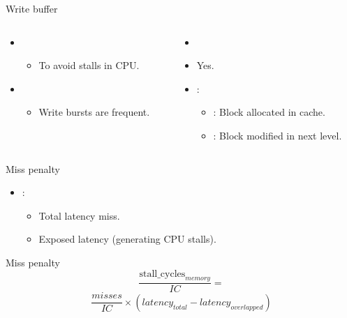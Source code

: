 \begin{frame}[t]{Write buffer}
\makebox[\textwidth][c]{

}

\begin{columns}[T]

\begin{column}{.5\textwidth}
\begin{itemize}
  \item {}
    \begin{itemize}
      \item To avoid stalls in CPU.
    \end{itemize}
  \item {}
    \begin{itemize}
      \item Write bursts are frequent.
    \end{itemize}
\end{itemize}
\end{column}

\begin{column}{.5\textwidth}
\begin{itemize}
  \item {}
    \item Yes.
    \item {}:
      \begin{itemize}
        \item {}: Block allocated in cache.
        \item {}: Block modified in next level.
      \end{itemize}
\end{itemize}
\end{column}

\end{columns}
\end{frame}

\begin{frame}[t]{Miss penalty}
\begin{itemize}
  \item {}:
    \begin{itemize}
      \item Total latency miss.
      \item Exposed latency (generating CPU stalls).
    \end{itemize}
\end{itemize}

\begin{block}{Miss penalty}
\[
\frac{\text{stall\_cycles}_{memory}}{IC} =
\]
\[
\frac{misses}{IC} \times \left( latency_{total} - latency_{overlapped} \right)
\]
\end{block}
\end{frame}
